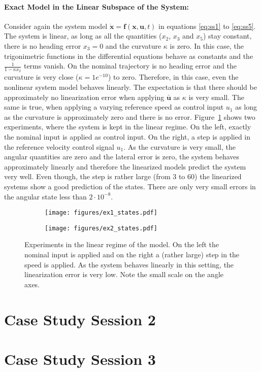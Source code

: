 \documentclass{scrartcl}
\newcommand{\bb}[1]{\boldsymbol{#1}}
\begin{document}
\paragraph{Exact Model in the Linear Subspace of the System: }
Consider again the system model $\mathbf{\dot{x}} = \mathbf{f}(\mathbf{x}, \mathbf{u}, t)$ in equations \eqref{eq:ss1} to \eqref{eq:ss5}.
The system is linear, as long as all the quantities ($x_2$, $x_3$ and $x_5$) stay constant, there is no heading error $x_3 = 0$ and the curvature $\kappa$ is zero.
In this case, the trigonimetric functions in the differential equations behave as constants and the $\frac{1}{1- \kappa x_2}$ terms vanish.
On the nominal trajectory is no heading error and the curvature is very close ($\kappa = 1e^{-10}$) to zero.
Therefore, in this case, even the nonlinear system model behaves linearly.
The expectation is that there should be approximately no linearization error when applying $\bb{\bar{u}}$ as $\kappa$ is very small.
The same is true, when applying a varying reference speed as control input $u_1$ as long as the curvature is approximately zero and there is no error.
Figure~\ref{fig:ex1_ex2} shows two experiments, where the system is kept in the linear regime.
On the left, exactly the nominal input is applied as control input.
On the right, a step is applied in the reference velocity control signal $u_1$.
As the curvature is very small, the angular quantities are zero and the lateral error is zero, the system behaves approximately linearly and therefore the linearized models predict the system very well.
Even though, the step is rather large (from $3$ to $60$) the linearized systems show a good prediction of the states.
There are only very small errors in the angular state less than $2\cdot 10^{-8}$.


\begin{figure}[h]
	\centering
	\begin{subfigure}{0.49\textwidth}
	\texttt{[image: figures/ex1\_states.pdf]}
	\subcaption{Applying exactly the nominal input $\bb{\bar{u}}$.}
	\end{subfigure}
	\begin{subfigure}{0.49\textwidth}
	\texttt{[image: figures/ex2\_states.pdf]}
	\end{subfigure}
	\caption{Experiments in the linear regime of the model. On the left the nominal input is applied and on the right a (rather large) step in the speed is applied. As the system behaves linearly in this setting, the linearization error is very low. Note the small scale on the angle axes.}
	\label{fig:ex1_ex2}
\end{figure}



\section{Case Study Session 2}
\section{Case Study Session 3}
\end{document}
